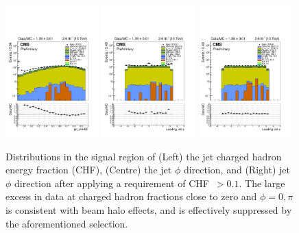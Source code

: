 \begin{figure}[h!]
    \begin{center}
        {\includegraphics[width=0.32\textwidth]{figures/selection/jet_chHEF_mono_all_before.pdf}}
        {\includegraphics[width=0.32\textwidth]{figures/selection/jet_phi[0]_mono_all_before.pdf}}
        {\includegraphics[width=0.32\textwidth]{figures/selection/jet_phi[0]_mono_all_after.pdf}}
        \caption{Distributions in the signal region of (Left) the jet
          charged hadron energy fraction (CHF), (Centre) the jet
          $\phi$ direction, and (Right) jet $\phi$ direction after
          applying a requirement of {CHF~$>0.1$}. The large excess in
          data at charged hadron fractions close to zero and ${\phi =
            0, \pi}$ is consistent with beam halo effects, and is
          effectively suppressed by the aforementioned selection.}
        \label{fig:leadJetCleaning}
    \end{center}
\end{figure}

